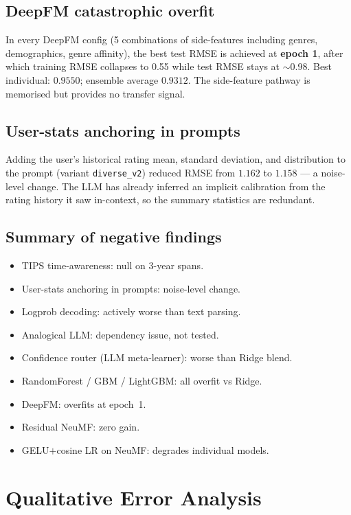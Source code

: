 \documentclass[11pt,a4paper]{article}
\begin{document}
\subsection{DeepFM catastrophic overfit}
In every DeepFM config (5 combinations of side-features including genres,
demographics, genre affinity), the best test RMSE is achieved at
\textbf{epoch 1}, after which training RMSE collapses to 0.55 while test
RMSE stays at $\sim$0.98. Best individual: $0.9550$; ensemble average $0.9312$.
The side-feature pathway is memorised but provides no transfer signal.

\subsection{User-stats anchoring in prompts}
Adding the user's historical rating mean, standard deviation, and
distribution to the prompt (variant \texttt{diverse\_v2}) reduced RMSE
from $1.162$ to $1.158$ --- a noise-level change. The LLM has already
inferred an implicit calibration from the rating history it saw in-context,
so the summary statistics are redundant.

\subsection{Summary of negative findings}
\begin{itemize}[leftmargin=1.5em,itemsep=1pt]
\item TIPS time-awareness: null on 3-year spans.
\item User-stats anchoring in prompts: noise-level change.
\item Logprob decoding: actively worse than text parsing.
\item Analogical LLM: dependency issue, not tested.
\item Confidence router (LLM meta-learner): worse than Ridge blend.
\item RandomForest / GBM / LightGBM: all overfit vs Ridge.
\item DeepFM: overfits at epoch~1.
\item Residual NeuMF: zero gain.
\item GELU$+$cosine LR on NeuMF: degrades individual models.
\end{itemize}

\section{Qualitative Error Analysis}
\label{sec:qualitative}
\end{document}
